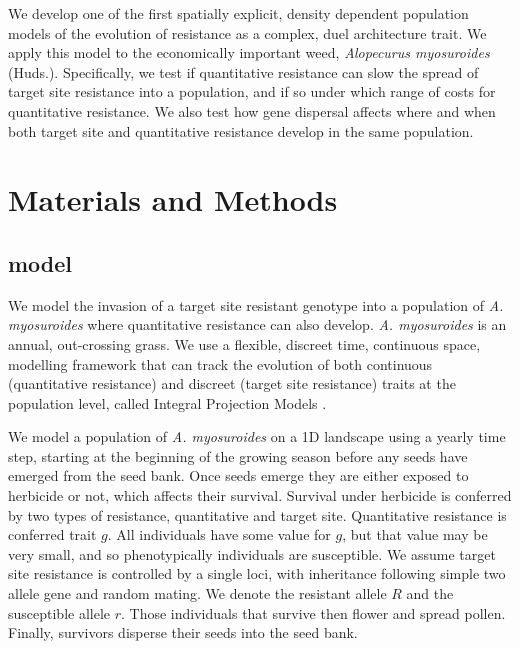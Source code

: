 \documentclass[10pt,letterpaper]{article}
\begin{document}
We develop one of the first spatially explicit, density dependent population models of the evolution of resistance as a complex, duel architecture trait. We apply this model to the economically important weed, \textit{Alopecurus myosuroides} (Huds.). Specifically, we test if quantitative resistance can slow the spread of target site resistance into a population, and if so under which range of costs for quantitative resistance. We also test how gene dispersal affects where and when both target site and quantitative resistance develop in the same population. 

\section*{Materials and Methods}
\subsection*{model}
We model the invasion of a target site resistant genotype into a population of \textit{A. myosuroides} where quantitative resistance can also develop. \textit{A. myosuroides} is an annual, out-crossing grass. We use a flexible, discreet time, continuous space, modelling framework that can track the evolution of both continuous (quantitative resistance) and discreet (target site resistance) traits at the population level, called Integral Projection Models \cite{Elln2006}.     

We model a population of \textit{A. myosuroides} on a 1D landscape using a yearly time step, starting at the beginning of the growing season before any seeds have emerged from the seed bank. Once seeds emerge they are either exposed to herbicide or not, which affects their survival. Survival under herbicide is conferred by two types of resistance, quantitative and target site. Quantitative resistance is conferred trait $g$. All individuals have some value for $g$, but that value may be very small, and so phenotypically individuals are susceptible. We assume target site resistance is controlled by a single loci, with inheritance following simple two allele gene and random mating. We denote the resistant allele $R$ and the susceptible allele $r$. Those individuals that survive then flower and spread pollen. Finally, survivors disperse their seeds into the seed bank.  
\end{document}
